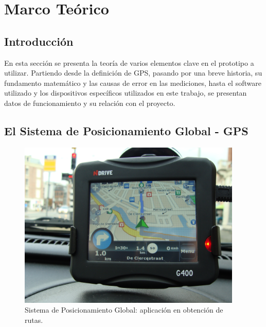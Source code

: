 
\chapter{Marco Teórico} %

\label{Chap:Marco} %




\section{Introducción}

En esta sección se presenta la teoría de varios elementos clave en el prototipo a utilizar. Partiendo desde la definición de GPS, pasando por una breve historia, su fundamento matemático y las causas de error en las mediciones, hasta el software utilizado y los dispositivos específicos utilizados en este trabajo, se presentan datos de funcionamiento y su relación con el proyecto.

\section{El Sistema de Posicionamiento Global - GPS}

\begin{figure}[ht]
\centering
\includegraphics[width=0.95\textwidth]{Figures/GPS}
\caption[Sistema de Posicionamiento Global: aplicación en obtención de rutas.]{Sistema de Posicionamiento Global: aplicación en obtención de rutas.\footnotemark}
\label{fig:GPS}
\end{figure}

